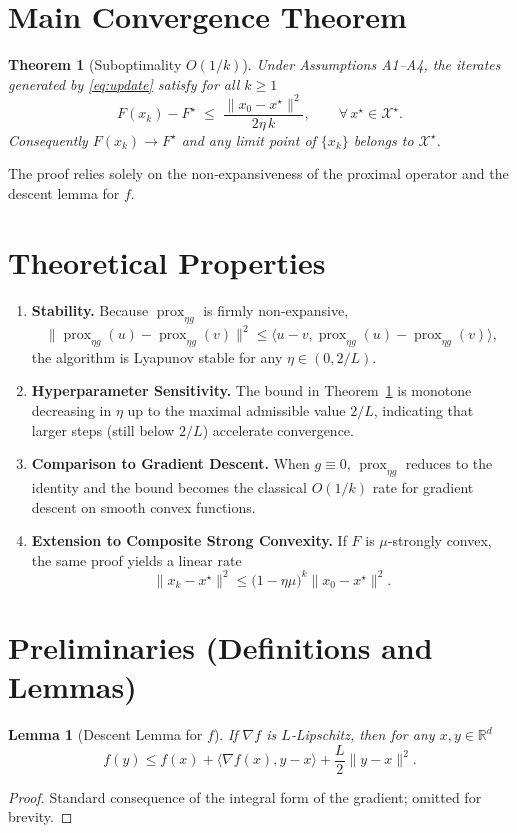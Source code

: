 \documentclass{article}
\newtheorem{theorem}{Theorem}
\newtheorem{lemma}{Lemma}
\newcommand{\prox}{\operatorname{prox}}
\newcommand{\R}{\mathbb{R}}
\begin{document}
\section*{Main Convergence Theorem}
\begin{theorem}[Suboptimality $O(1/k)$]
\label{thm:rate}
Under Assumptions A1–A4, the iterates generated by \eqref{eq:update} satisfy for all $k\ge 1$
\[
F(x_{k})-F^{\star}\;\le\;\frac{\|x_{0}-x^{\star}\|^{2}}{2\eta\,k},
\qquad\forall\,x^{\star}\in\mathcal{X}^{\star}.
\]
Consequently $F(x_{k})\to F^{\star}$ and any limit point of $\{x_{k}\}$ belongs to $\mathcal{X}^{\star}$.
\end{theorem}
The proof relies solely on the non‑expansiveness of the proximal operator and the descent lemma for $f$.

\section*{Theoretical Properties}
\begin{enumerate}[label={P\arabic*}:, leftmargin=*, noitemsep]
\item \textbf{Stability.} Because $\prox_{\eta g}$ is firmly non‑expansive,
\[
\|\prox_{\eta g}(u)-\prox_{\eta g}(v)\|^{2}\le\langle u-v,\prox_{\eta g}(u)-\prox_{\eta g}(v)\rangle,
\]
the algorithm is Lyapunov stable for any $\eta\in(0,2/L)$.
\item \textbf{Hyperparameter Sensitivity.}
The bound in Theorem~\ref{thm:rate} is monotone decreasing in $\eta$ up to the maximal admissible value $2/L$, indicating that larger steps (still below $2/L$) accelerate convergence.
\item \textbf{Comparison to Gradient Descent.}
When $g\equiv0$, $\prox_{\eta g}$ reduces to the identity and the bound becomes the classical $O(1/k)$ rate for gradient descent on smooth convex functions.
\item \textbf{Extension to Composite Strong Convexity.}
If $F$ is $\mu$‑strongly convex, the same proof yields a linear rate
\[
\|x_{k}-x^{\star}\|^{2}\le\bigl(1-\eta\mu\bigr)^{k}\|x_{0}-x^{\star}\|^{2}.
\]
\end{enumerate}

\section*{Preliminaries (Definitions and Lemmas)}
\begin{lemma}[Descent Lemma for $f$]
\label{lem:descent}
If $\nabla f$ is $L$‑Lipschitz, then for any $x,y\in\R^{d}$
\[
f(y)\le f(x)+\langle\nabla f(x),y-x\rangle+\frac{L}{2}\|y-x\|^{2}.
\tag{L1}
\]
\end{lemma}
\begin{proof}
Standard consequence of the integral form of the gradient; omitted for brevity. \qedhere
\end{proof}
\end{document}
